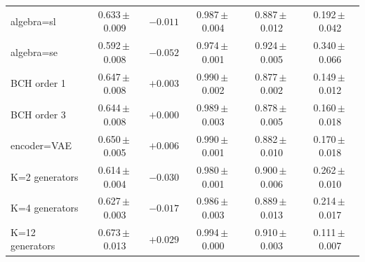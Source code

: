 \begin{table}[t]
\begin{tabular}{lccccc}
algebra=sl & 0.633\,\tiny{$\pm$\,0.009} & $-0.011$ & 0.987\,\tiny{$\pm$\,0.004} & 0.887\,\tiny{$\pm$\,0.012} & 0.192\,\tiny{$\pm$\,0.042} \\
algebra=se & 0.592\,\tiny{$\pm$\,0.008} & $-0.052$ & 0.974\,\tiny{$\pm$\,0.001} & 0.924\,\tiny{$\pm$\,0.005} & 0.340\,\tiny{$\pm$\,0.066} \\
BCH order 1 & 0.647\,\tiny{$\pm$\,0.008} & $+0.003$ & 0.990\,\tiny{$\pm$\,0.002} & 0.877\,\tiny{$\pm$\,0.002} & 0.149\,\tiny{$\pm$\,0.012} \\
BCH order 3 & 0.644\,\tiny{$\pm$\,0.008} & $+0.000$ & 0.989\,\tiny{$\pm$\,0.003} & 0.878\,\tiny{$\pm$\,0.005} & 0.160\,\tiny{$\pm$\,0.018} \\
encoder=VAE & 0.650\,\tiny{$\pm$\,0.005} & $+0.006$ & 0.990\,\tiny{$\pm$\,0.001} & 0.882\,\tiny{$\pm$\,0.010} & 0.170\,\tiny{$\pm$\,0.018} \\
K=2 generators & 0.614\,\tiny{$\pm$\,0.004} & $-0.030$ & 0.980\,\tiny{$\pm$\,0.001} & 0.900\,\tiny{$\pm$\,0.006} & 0.262\,\tiny{$\pm$\,0.010} \\
K=4 generators & 0.627\,\tiny{$\pm$\,0.003} & $-0.017$ & 0.986\,\tiny{$\pm$\,0.003} & 0.889\,\tiny{$\pm$\,0.013} & 0.214\,\tiny{$\pm$\,0.017} \\
K=12 generators & 0.673\,\tiny{$\pm$\,0.013} & $+0.029$ & 0.994\,\tiny{$\pm$\,0.000} & 0.910\,\tiny{$\pm$\,0.003} & 0.111\,\tiny{$\pm$\,0.007} \\
\bottomrule
\end{tabular}
\end{table}
